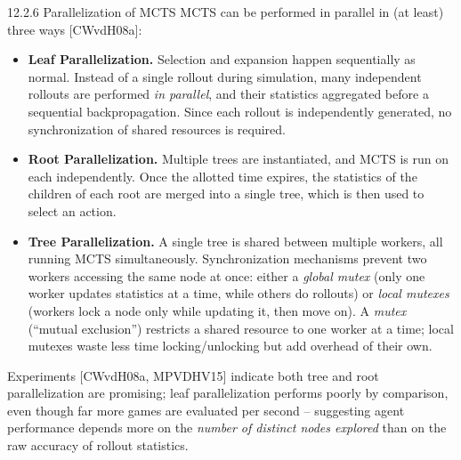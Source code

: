 \documentclass[aspectratio=169,10pt]{beamer}
\begin{document}
\begin{frame}{12.2.6 Parallelization of MCTS}
MCTS can be performed in parallel in (at least) three ways [CWvdH08a]:
\begin{itemize}
\item \textbf{Leaf Parallelization.} Selection and expansion happen sequentially as
normal. Instead of a single rollout during simulation, many independent rollouts are
performed \emph{in parallel}, and their statistics aggregated before a sequential
backpropagation. Since each rollout is independently generated, no synchronization of
shared resources is required.
\item \textbf{Root Parallelization.} Multiple trees are instantiated, and MCTS is run on
each independently. Once the allotted time expires, the statistics of the children of
each root are merged into a single tree, which is then used to select an action.
\item \textbf{Tree Parallelization.} A single tree is shared between multiple workers,
all running MCTS simultaneously. Synchronization mechanisms prevent two workers accessing
the same node at once: either a \emph{global mutex} (only one worker updates statistics
at a time, while others do rollouts) or \emph{local mutexes} (workers lock a node only
while updating it, then move on). A \emph{mutex} (``mutual exclusion'') restricts a shared
resource to one worker at a time; local mutexes waste less time locking/unlocking but add
overhead of their own.
\end{itemize}
Experiments [CWvdH08a, MPVDHV15] indicate both tree and root parallelization are promising;
leaf parallelization performs poorly by comparison, even though far more games are
evaluated per second -- suggesting agent performance depends more on the \emph{number of
distinct nodes explored} than on the raw accuracy of rollout statistics.
\end{frame}
\end{document}
